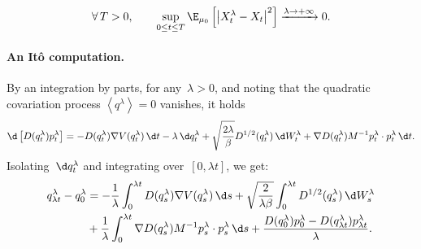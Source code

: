 \begin{equation}
    \label{05:eq:convergence}
    \forall\,T>0,\qquad\underset{0\leq t\leq T}{\sup}\,\E_{\mu_0}\left[ \left|X_t^\lambda-X_t\right|^2\right]\xrightarrow{\lambda\to+\infty}0.
\end{equation}
\paragraph{An It\^o computation.}
By an integration by parts, for any~$\lambda>0$, and noting that the quadratic covariation process $\left\langle q^\lambda\right\rangle = 0$ vanishes, it holds
\begin{equation}
    \d\left[D(q_t^\lambda)p_t^\lambda\right] = -D(q_t^\lambda)\nabla V(q_t^\lambda)\,\d t - \lambda\,\d q_t^\lambda + \sqrt{\frac{2\lambda}{\beta}}D^{1/2}(q_t^\lambda)\,\d W_t^\lambda + \nabla D(q_t^\lambda) M^{-1}p_t^\lambda\cdot p_t^\lambda\,\d t.
\end{equation}
Isolating~$\d q_t^\lambda$ and integrating over~$[0,\lambda t]$, we get:
    \begin{equation}
        \label{05:eq:ipp_sto}
        \begin{aligned}
        q_{\lambda t}^\lambda- q_0^\lambda &= -\frac{1}{\lambda}\int_0^{\lambda t}D(q_s^\lambda)\nabla V(q_s^\lambda)\,\d s+ \sqrt{\frac{2}{\lambda\beta}}\int_0^{\lambda t}D^{1/2}(q_s^\lambda)\,\d W_s^\lambda\\
        &+ \frac{1}{\lambda}\int_0^{\lambda t}\nabla D(q_s^\lambda)M^{-1}p_s^\lambda\cdot p_s^\lambda\,\d s+\frac{D(q_0^\lambda)p_0^\lambda - D(q_{\lambda t}^\lambda)p_{\lambda t}^\lambda}{\lambda}.
        \end{aligned}
    \end{equation}

